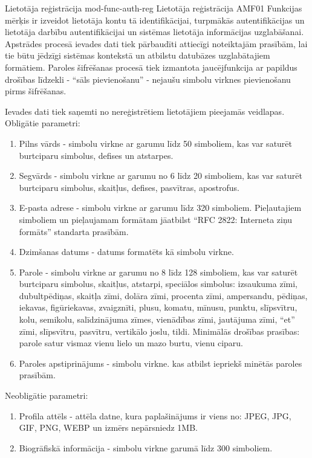 \moduleFunctionTable
{Lietotāja reģistrācija}
{mod-func-auth-reg}
{Lietotāja reģistrācija}
{AMF01}
{
	Funkcijas mērķis ir izveidot lietotāja kontu tā identifikācijai, turpmākās autentifikācijas un lietotāja darbību autentifikācijai un sistēmas lietotāja informācijas uzglabāšanai.
	Apstrādes procesā ievades dati tiek pārbaudīti attiecīgi noteiktajām prasībām, lai tie būtu jēdzīgi sistēmas kontekstā un atbilstu datubāzes uzglabātajiem formātiem.
	Paroles šifrēšanas procesā tiek izmantota jaucējfunkcija ar papildus drošības līdzekli - ``sāls pievienošanu'' - nejaušu simbolu virknes pievienošanu pirms šifrēšanas.
}
{
	Ievades dati tiek saņemti no nereģistrētiem lietotājiem pieejamās veidlapas. \\

	Obligātie parametri:
	\begin{enumerate}
		\item Pilns vārds - simbolu virkne ar garumu līdz 50 simboliem, kas var saturēt burtciparu simbolus, defises un atstarpes.
		\item Segvārds - simbolu virkne ar garumu no 6 līdz 20 simboliem, kas var saturēt burtciparu simbolus, skaitļus, defises, pasvītras, apostrofus.
		\item E-pasta adrese - simbolu virkne ar garumu līdz 320 simboliem. Pieļautajiem simboliem un pieļaujamam formātam jāatbilst ``RFC 2822: Interneta ziņu formāts'' standarta prasībām.
		\item Dzimšanas datums - datums formatēts kā simbolu virkne.
		\item Parole - simbolu virkne ar garumu no 8 līdz 128 simboliem, kas var saturēt burtciparu simbolus, skaitļus, atstarpi, speciālos simbolus:
		      izsaukuma zīmi, dubultpēdiņas, skaitļa zīmi, dolāra zīmi, procenta zīmi, ampersandu, pēdiņas, iekavas, figūriekavas,
		      zvaigznīti, plusu, komatu, mīnusu, punktu, slīpsvītru, kolu, semikolu, salīdzinājuma zīmes, vienādības zīmi,
		      jautājuma zīmi, ``et'' zīmi, slīpsvītru, pasvītru, vertikālo joslu, tildi.
		      Minimālās drošības prasības: parole satur vismaz vienu lielo un mazo burtu, vienu ciparu.
		\item Paroles apstiprinājums - simbolu virkne. kas atbilst iepriekš minētās paroles prasībām.
	\end{enumerate}

	Neobligātie parametri:
	\begin{enumerate}
		\item Profila attēls - attēla datne, kura paplašinājums ir viens no: JPEG, JPG, GIF, PNG, WEBP un izmērs nepārsniedz 1MB.
		\item Biogrāfiskā informācija - simbolu virkne garumā līdz 300 simboliem.
	\end{enumerate}
}
